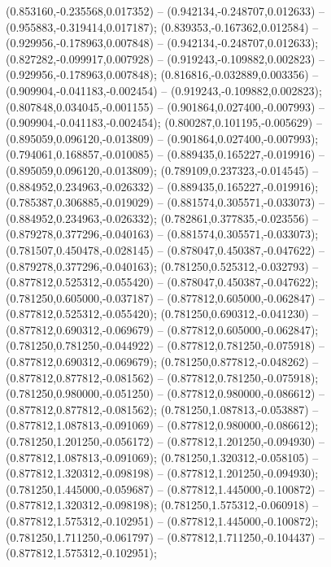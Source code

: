  (0.853160,-0.235568,0.017352) -- (0.942134,-0.248707,0.012633) -- (0.955883,-0.319414,0.017187);
 (0.839353,-0.167362,0.012584) -- (0.929956,-0.178963,0.007848) -- (0.942134,-0.248707,0.012633);
 (0.827282,-0.099917,0.007928) -- (0.919243,-0.109882,0.002823) -- (0.929956,-0.178963,0.007848);
 (0.816816,-0.032889,0.003356) -- (0.909904,-0.041183,-0.002454) -- (0.919243,-0.109882,0.002823);
 (0.807848,0.034045,-0.001155) -- (0.901864,0.027400,-0.007993) -- (0.909904,-0.041183,-0.002454);
 (0.800287,0.101195,-0.005629) -- (0.895059,0.096120,-0.013809) -- (0.901864,0.027400,-0.007993);
 (0.794061,0.168857,-0.010085) -- (0.889435,0.165227,-0.019916) -- (0.895059,0.096120,-0.013809);
 (0.789109,0.237323,-0.014545) -- (0.884952,0.234963,-0.026332) -- (0.889435,0.165227,-0.019916);
 (0.785387,0.306885,-0.019029) -- (0.881574,0.305571,-0.033073) -- (0.884952,0.234963,-0.026332);
 (0.782861,0.377835,-0.023556) -- (0.879278,0.377296,-0.040163) -- (0.881574,0.305571,-0.033073);
 (0.781507,0.450478,-0.028145) -- (0.878047,0.450387,-0.047622) -- (0.879278,0.377296,-0.040163);
 (0.781250,0.525312,-0.032793) -- (0.877812,0.525312,-0.055420) -- (0.878047,0.450387,-0.047622);
 (0.781250,0.605000,-0.037187) -- (0.877812,0.605000,-0.062847) -- (0.877812,0.525312,-0.055420);
 (0.781250,0.690312,-0.041230) -- (0.877812,0.690312,-0.069679) -- (0.877812,0.605000,-0.062847);
 (0.781250,0.781250,-0.044922) -- (0.877812,0.781250,-0.075918) -- (0.877812,0.690312,-0.069679);
 (0.781250,0.877812,-0.048262) -- (0.877812,0.877812,-0.081562) -- (0.877812,0.781250,-0.075918);
 (0.781250,0.980000,-0.051250) -- (0.877812,0.980000,-0.086612) -- (0.877812,0.877812,-0.081562);
 (0.781250,1.087813,-0.053887) -- (0.877812,1.087813,-0.091069) -- (0.877812,0.980000,-0.086612);
 (0.781250,1.201250,-0.056172) -- (0.877812,1.201250,-0.094930) -- (0.877812,1.087813,-0.091069);
 (0.781250,1.320312,-0.058105) -- (0.877812,1.320312,-0.098198) -- (0.877812,1.201250,-0.094930);
 (0.781250,1.445000,-0.059687) -- (0.877812,1.445000,-0.100872) -- (0.877812,1.320312,-0.098198);
 (0.781250,1.575312,-0.060918) -- (0.877812,1.575312,-0.102951) -- (0.877812,1.445000,-0.100872);
 (0.781250,1.711250,-0.061797) -- (0.877812,1.711250,-0.104437) -- (0.877812,1.575312,-0.102951);
